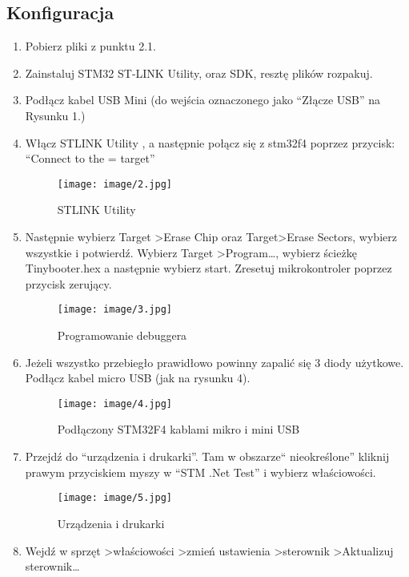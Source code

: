 \documentclass{article}
\begin{document}
\subsection{Konfiguracja}
\begin{enumerate}
\item Pobierz pliki z punktu 2.1.
\item Zainstaluj STM32 ST-LINK Utility, oraz SDK, resztę plików rozpakuj.
\item Podłącz kabel USB Mini (do wejścia oznaczonego jako “Złącze USB” na Rysunku 1.)
\item Włącz STLINK Utility , a następnie połącz się z stm32f4 poprzez przycisk: “Connect to the = target”

\begin{figure}[H]
\texttt{[image: image/2.jpg]}
\caption{STLINK Utility}
\end{figure}

\item Następnie wybierz Target \textgreater Erase Chip oraz Target\textgreater Erase Sectors, wybierz wszystkie i potwierdź. Wybierz Target \textgreater Program…, wybierz ścieżkę Tinybooter.hex a następnie wybierz start. Zresetuj mikrokontroler poprzez przycisk zerujący.

\begin{figure}[H]
\texttt{[image: image/3.jpg]}
\caption{Programowanie debuggera}
\end{figure}

\item Jeżeli wszystko przebiegło prawidłowo powinny zapalić się 3 diody użytkowe. Podłącz kabel micro USB (jak na rysunku 4).

\begin{figure}[H]
\texttt{[image: image/4.jpg]}
\caption{Podłączony STM32F4 kablami mikro i mini USB}
\end{figure}

\item Przejdź do “urządzenia i drukarki”. Tam w obszarze“ nieokreślone” kliknij prawym przyciskiem myszy w “STM .Net Test” i wybierz właściowości.

\begin{figure}[H]
\texttt{[image: image/5.jpg]}
\caption{Urządzenia i drukarki}
\end{figure}

\item Wejdź w sprzęt \textgreater właściowości \textgreater zmień ustawienia \textgreater sterownik \textgreater Aktualizuj sterownik…


\end{enumerate}
\end{document}
